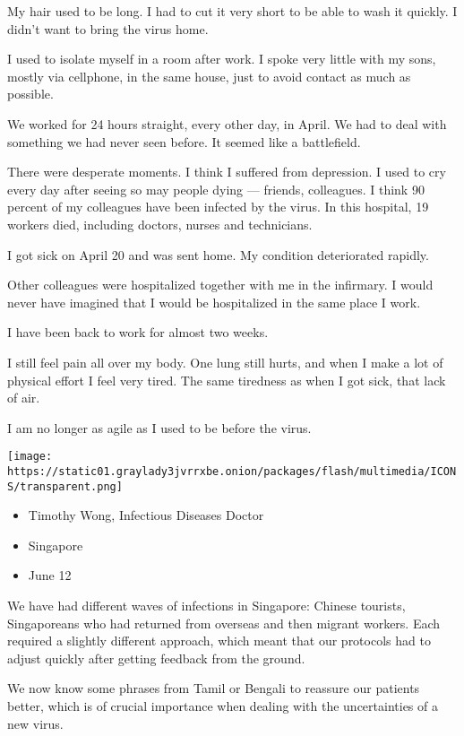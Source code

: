 My hair used to be long. I had to cut it very short to be able to wash
it quickly. I didn't want to bring the virus home.

I used to isolate myself in a room after work. I spoke very little with
my sons, mostly via cellphone, in the same house, just to avoid contact
as much as possible.

We worked for 24 hours straight, every other day, in April. We had to
deal with something we had never seen before. It seemed like a
battlefield.

There were desperate moments. I think I suffered from depression. I used
to cry every day after seeing so may people dying --- friends,
colleagues. I think 90 percent of my colleagues have been infected by
the virus. In this hospital, 19 workers died, including doctors, nurses
and technicians.

I got sick on April 20 and was sent home. My condition deteriorated
rapidly.

Other colleagues were hospitalized together with me in the infirmary. I
would never have imagined that I would be hospitalized in the same place
I work.

I have been back to work for almost two weeks.

I still feel pain all over my body. One lung still hurts, and when I
make a lot of physical effort I feel very tired. The same tiredness as
when I got sick, that lack of air.

I am no longer as agile as I used to be before the virus.

\texttt{[image: https://static01.graylady3jvrrxbe.onion/packages/flash/multimedia/ICONS/transparent.png]}

\begin{itemize}
\tightlist
\item
  Timothy Wong, Infectious Diseases Doctor
\item
  Singapore
\item
  June 12
\end{itemize}

We have had different waves of infections in Singapore: Chinese
tourists, Singaporeans who had returned from overseas and then migrant
workers. Each required a slightly different approach, which meant that
our protocols had to adjust quickly after getting feedback from the
ground.

We now know some phrases from Tamil or Bengali to reassure our patients
better, which is of crucial importance when dealing with the
uncertainties of a new virus.

